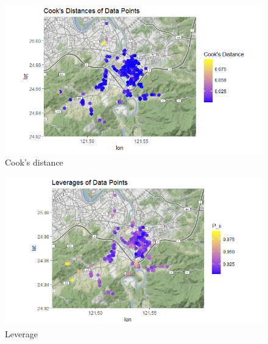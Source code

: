 \begin{figure}[hbt!]
    \centering
    \includegraphics[scale=0.80]{img/cook.png}
    \caption{Cook's distance}
    \label{fig:cook}
\end{figure}

\begin{figure}[hbt!]
    \centering
    \includegraphics[scale=0.80]{img/lev.png}
    \caption{Leverage}
    \label{fig:lev}
\end{figure}

